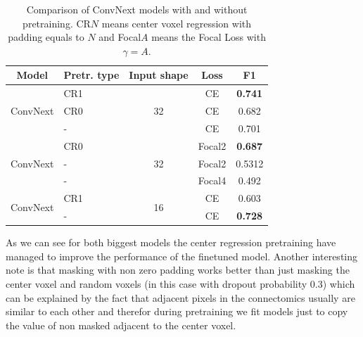 \documentclass[twocolumn, a4paper]{article}
\theoremstyle{definition}
\begin{document}
\begin{table}[ht]
    \centering
    \begin{tabular}{|c| >{\centering\arraybackslash}p{1cm}|c|c|c| }
        \hline
        \textbf{Model}            & \textbf{Pretr. type} & \textbf{Input shape} & \textbf{Loss} & \textbf{F1}    \\
        \hline
        \multirow{3}{*}{ConvNext} & CR1                  & \multirow{3}{*}{32}  & CE            & \textbf{0.741} \\
                                  & CR0                  &                      & CE            & 0.682          \\
                                  & -                    &                      & CE            & 0.701          \\
        \hline
        \multirow{3}{*}{ConvNext} & CR0                  & \multirow{3}{*}{32 } & Focal2        & \textbf{0.687} \\
                                  & -                    &                      & Focal2        & 0.5312         \\
                                  & -                    &                      & Focal4        & 0.492          \\
        \hline
        \multirow{2}{*}{ConvNext} & CR1                  & \multirow{2}{*}{16 } & CE            & 0.603          \\
                                  & -                    &                      & CE            & \textbf{0.728} \\
        \hline
    \end{tabular}
    \caption{Comparison of ConvNext models with and without pretraining. CR\(N\) means center voxel regression
        with padding equals to \(N\) and
        Focal\(A\) means the Focal Loss with \( \gamma = A \).}
    \label{tab:pretraining_comparison}
\end{table}

As we can see for both biggest models the center regression pretraining have managed to improve the performance of the
finetuned model. Another interesting note is that masking with non zero padding works better than just masking the center voxel and random
voxels (in this case with dropout probability \( 0.3 \)) which can be explained by the fact that adjacent pixels in the
connectomics usually are similar to each other and therefor during pretraining we fit models just to copy the value of
non masked adjacent to the center voxel.
\end{document}
